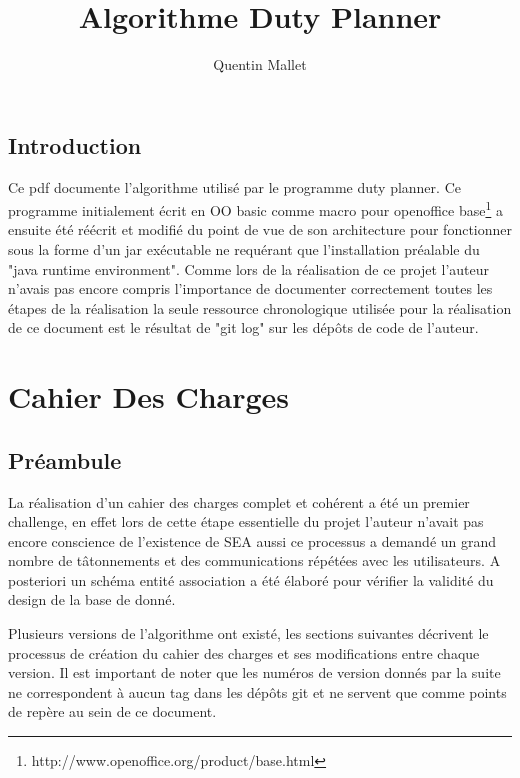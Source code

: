 \documentclass[11pt]{report}
\begin{document}
\title{Algorithme Duty Planner}

\author{Quentin Mallet}


\maketitle

\tableofcontents

\newpage

\section{Introduction}
Ce pdf documente l'algorithme utilisé par le programme duty planner.
Ce programme initialement écrit en OO basic\cite{basicguide} comme macro pour openoffice base\footnote{http://www.openoffice.org/product/base.html} a ensuite été réécrit et modifié du point de vue de son architecture pour fonctionner sous la forme d'un jar exécutable ne requérant que l'installation préalable du "java runtime environment". 
Comme lors de la réalisation de ce projet l'auteur n'avais pas encore compris l'importance de documenter correctement toutes les étapes de la réalisation la seule ressource chronologique utilisée pour la réalisation de ce document est le résultat de "git log" sur les dépôts de code de l'auteur.

\chapter{Cahier Des Charges}
\section{Préambule}
La réalisation d'un cahier des charges complet et cohérent a été un premier challenge, en effet lors de cette étape essentielle du projet l'auteur n'avait pas encore conscience de l'existence de SEA aussi ce processus a demandé un grand nombre de tâtonnements et des communications répétées avec les utilisateurs. 
A posteriori un schéma entité association a été élaboré pour vérifier la validité du design de la base de donné.

Plusieurs versions de l'algorithme ont existé, les sections suivantes décrivent le processus de création du cahier des charges et ses modifications entre chaque version. 
Il est important de noter que les numéros de version donnés par la suite ne correspondent à aucun tag dans les dépôts git et ne servent que comme points de repère au sein de ce document.
\end{document}
